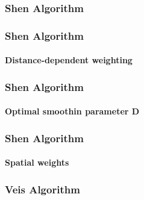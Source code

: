 \begin{frame}
 \frametitle{Shen Algorithm}
 \framesubtitle{}
 \label{ch2:}

\end{frame}
\note{}


\begin{frame}
 \frametitle{Shen Algorithm}
 \framesubtitle{Distance-dependent weighting}
 \label{ch2:}

\end{frame}
\note{}

\begin{frame}
 \frametitle{Shen Algorithm}
 \framesubtitle{Optimal smoothin parameter D}
 \label{ch2:}

\end{frame}
\note{}

\begin{frame}
 \frametitle{Shen Algorithm}
 \framesubtitle{Spatial weights}
 \label{ch2:}

\end{frame}
\note{}

\begin{frame}
 \frametitle{Veis Algorithm}
 \framesubtitle{}
 \label{ch2:}

\end{frame}
\note{}




